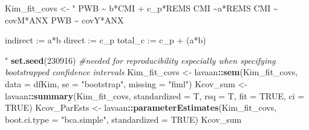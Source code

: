 \documentclass[
  11pt,
]{book}
\newenvironment{Shaded}{\begin{snugshade}}{\end{snugshade}}
\newcommand{\AttributeTok}[1]{\textcolor[rgb]{0.27,0.27,0.27}{#1}}
\newcommand{\CommentTok}[1]{\textcolor[rgb]{0.37,0.37,0.37}{\textit{#1}}}
\newcommand{\ConstantTok}[1]{\textcolor[rgb]{0.37,0.37,0.37}{#1}}
\newcommand{\DecValTok}[1]{\textcolor[rgb]{0.06,0.06,0.06}{#1}}
\newcommand{\FunctionTok}[1]{\textcolor[rgb]{0.27,0.27,0.27}{\textbf{#1}}}
\newcommand{\NormalTok}[1]{#1}
\newcommand{\OtherTok}[1]{\textcolor[rgb]{0.37,0.37,0.37}{#1}}
\newcommand{\SpecialCharTok}[1]{\textcolor[rgb]{0.43,0.43,0.43}{\textbf{#1}}}
\newcommand{\StringTok}[1]{\textcolor[rgb]{0.5,0.5,0.5}{#1}}
\begin{document}
\begin{Shaded}
\begin{Highlighting}[]
\NormalTok{Kim\_fit\_covs }\OtherTok{\textless{}{-}} \StringTok{"}
\StringTok{          PWB \textasciitilde{} b*CMI + c\_p*REMS }
\StringTok{          CMI \textasciitilde{}a*REMS}
\StringTok{          CMI \textasciitilde{} covM*ANX}
\StringTok{          PWB \textasciitilde{} covY*ANX}

\StringTok{          indirect :=  a*b}
\StringTok{          direct  := c\_p}
\StringTok{          total\_c  := c\_p + (a*b)}

\StringTok{          "}
\FunctionTok{set.seed}\NormalTok{(}\DecValTok{230916}\NormalTok{)  }\CommentTok{\#needed for reproducibility especially when specifying bootstrapped confidence intervals}
\NormalTok{Kim\_fit\_covs }\OtherTok{\textless{}{-}}\NormalTok{ lavaan}\SpecialCharTok{::}\FunctionTok{sem}\NormalTok{(Kim\_fit\_covs, }\AttributeTok{data =}\NormalTok{ dfKim, }\AttributeTok{se =} \StringTok{"bootstrap"}\NormalTok{,}
    \AttributeTok{missing =} \StringTok{"fiml"}\NormalTok{)}
\NormalTok{Kcov\_sum }\OtherTok{\textless{}{-}}\NormalTok{ lavaan}\SpecialCharTok{::}\FunctionTok{summary}\NormalTok{(Kim\_fit\_covs, }\AttributeTok{standardized =}\NormalTok{ T, }\AttributeTok{rsq =}\NormalTok{ T, }\AttributeTok{fit =} \ConstantTok{TRUE}\NormalTok{,}
    \AttributeTok{ci =} \ConstantTok{TRUE}\NormalTok{)}
\NormalTok{Kcov\_ParEsts }\OtherTok{\textless{}{-}}\NormalTok{ lavaan}\SpecialCharTok{::}\FunctionTok{parameterEstimates}\NormalTok{(Kim\_fit\_covs, }\AttributeTok{boot.ci.type =} \StringTok{"bca.simple"}\NormalTok{,}
    \AttributeTok{standardized =} \ConstantTok{TRUE}\NormalTok{)}
\NormalTok{Kcov\_sum}
\end{Highlighting}
\end{Shaded}
\end{document}
